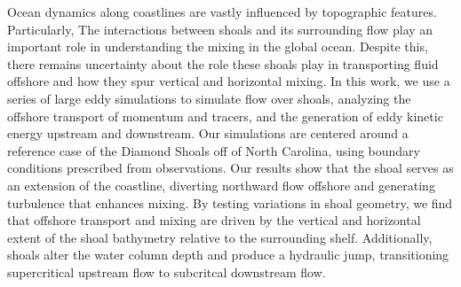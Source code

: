 Ocean dynamics along coastlines are vastly influenced by topographic features. Particularly, The interactions between shoals and its surrounding flow play an important role in understanding the mixing in the global ocean. Despite this, there remains uncertainty about the role these shoals play in transporting fluid offshore and how they spur vertical and horizontal mixing. In this work, we use a series of large eddy simulations to simulate flow over shoals, analyzing the offshore transport of momentum and tracers, and the generation of eddy kinetic energy upstream and downstream. Our simulations are centered around a reference case of the Diamond Shoals off of North Carolina, using boundary conditions prescribed from observations. Our results show that the shoal serves as an extension of the coastline, diverting northward flow offshore and generating turbulence that enhances mixing. By testing variations in shoal geometry, we find that offshore transport and mixing are driven by the vertical and horizontal extent of the shoal bathymetry relative to the surrounding shelf. Additionally, shoals alter the water column depth and produce a hydraulic jump, transitioning supercritical upstream flow to subcritcal downstream flow. 
\clearpage
